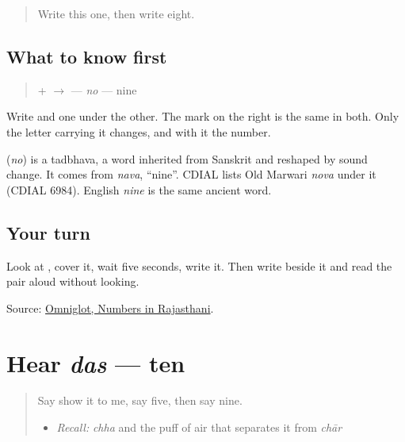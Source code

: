 \begin{quote}
Write this one, then write eight.
\end{quote}

\subsection*{What to know first}
\begin{quote}
\textbf{} + \textbf{} $\to$ \textbf{} — \emph{no} — nine
\end{quote}

Write \textbf{} and \textbf{} one under the other. The mark on the right is the same in both. Only the letter carrying it changes, and with it the number.

\begin{cousinweb}
\textbf{} (\emph{no}) is a tadbhava, a word inherited from Sanskrit and reshaped by sound change. It comes from \emph{nava}, \textquotedblleft{}nine\textquotedblright{}. CDIAL lists Old Marwari \emph{nova} under it (CDIAL 6984). English \emph{nine} is the same ancient word.
\end{cousinweb}

\subsection*{Your turn}
Look at \textbf{}, cover it, wait five seconds, write it. Then write \textbf{} beside it and read the pair aloud without looking.

\begin{tcolorbox}[breakable,colback=teal!4,colframe=teal!35!black,title={Before you move on}]
Source: \href{https://www.omniglot.com/language/numbers/rajasthani.htm}{Omniglot, Numbers in Rajasthani}.
\end{tcolorbox}
\section[das]{Hear \emph{das} — ten}

\label{lesson:MW-C33-hear-das}



\begin{quote}
Say show it to me, say five, then say nine.

\begin{itemize}
\raggedright
  \item \emph{Recall:} \emph{chha} and the puff of air that separates it from \emph{chār}
\end{itemize}
\end{quote}

